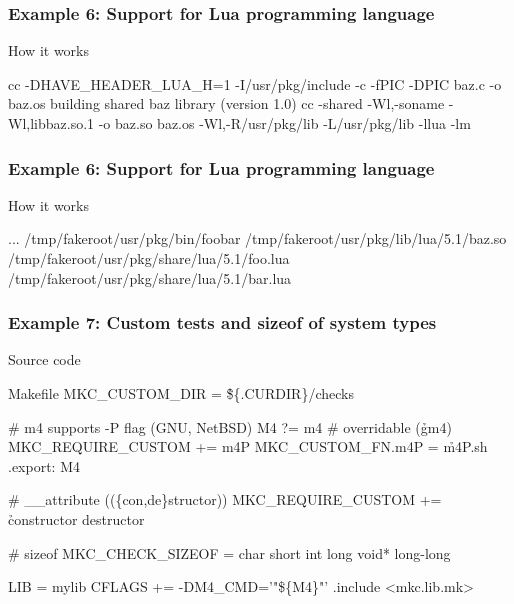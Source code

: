 \documentclass[hyperref={colorlinks=true}]{beamer}
\begin{document}
\begin{frame}[fragile]
  \frametitle{Example 6: Support for Lua programming language}

  \begin{block}{How it works}
  \begin{CodeNoLabel}
cc -DHAVE_HEADER_LUA_H=1 -I/usr/pkg/include
   -c -fPIC -DPIC baz.c -o baz.os
building shared baz library (version 1.0)
cc -shared -Wl,-soname -Wl,libbaz.so.1 -o baz.so  baz.os
   -Wl,-R/usr/pkg/lib -L/usr/pkg/lib -llua -lm
\prompt{\$}
  \end{CodeNoLabel}
  \end{block}
\end{frame}

\begin{frame}[fragile]
  \frametitle{Example 6: Support for Lua programming language}

  \begin{block}{How it works}
  \begin{CodeNoLabel}
    ...
/tmp/fakeroot/usr/pkg/bin/foobar
/tmp/fakeroot/usr/pkg/lib/lua/5.1/baz.so
/tmp/fakeroot/usr/pkg/share/lua/5.1/foo.lua
/tmp/fakeroot/usr/pkg/share/lua/5.1/bar.lua
\prompt{\$}
  \end{CodeNoLabel}
  \end{block}
\end{frame}

\begin{frame}[fragile]
  \frametitle{Example 7: Custom tests and sizeof of system types}

\begin{block}{Source code}
\begin{Code}{Makefile}
MKC\_CUSTOM\_DIR      = \h{\$\{.CURDIR\}/checks}

# m4 supports -P flag (GNU, NetBSD)
M4                 ?= m4 # overridable (\h{gm4})
MKC\_REQUIRE\_CUSTOM += m4P
MKC\_CUSTOM\_FN.m4P   = \h{m4P.sh}
.export: M4

# \_\_attribute ((\{con,de\}structor))
MKC\_REQUIRE\_CUSTOM += \h{constructor destructor}

# sizeof
MKC\_CHECK\_SIZEOF    = char short int long void* long-long

LIB                 = mylib
CFLAGS             += -DM4\_CMD='"\$\{M4\}"'
.include <mkc.lib.mk>
\end{Code}
\end{block}
\end{frame}
\end{document}
